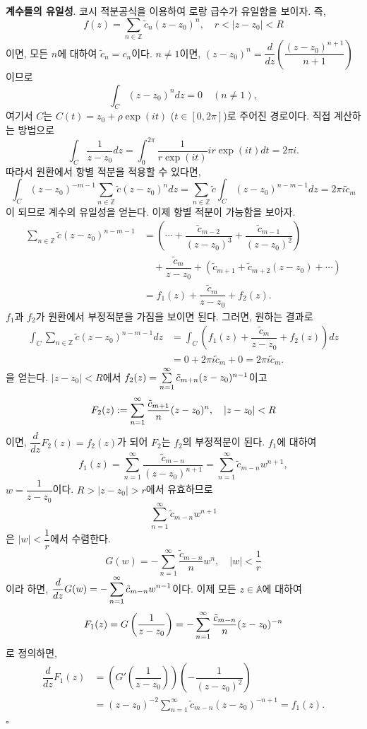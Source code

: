{\bf 계수들의 유일성}.
코시 적분공식을 이용하여 로랑 급수가 유일함을 보이자. 즉,
\[
f(z) = \sum_{n\in\mathbb Z} \tilde c_n(z-z_0)^n, \quad
r < |z-z_0| <R
\]
이면, 모든 $n$에 대하여 $\tilde c_n = c_n$이다.
$n\ne 1$이면, $(z-z_0)^n = \dfrac d{dz} \left( \dfrac{(z-z_0)^{n+1}}{n+1} \right)$이므로
\[
\int_C (z-z_0)^n dz = 0 \quad (n\ne1),
\]
여기서 $C$는 $C(t)=z_0 + \rho\exp(it)$ ($t\in[0,2\pi]$)로 주어진 경로이다.
직접 계산하는 방법으로
\[
\int_C \dfrac1{z-z_0} dz = \int_0^{2\pi} \dfrac1{r\exp(it)}ir\exp(it)dt = 2\pi i.
\]
따라서 원환에서 항별 적분을 적용할 수 있다면,
\[
\int_C (z-z_0)^{-m-1} \sum_{n\in\mathbb Z} \tilde c (z-z_0)^n dz
= \sum_{n\in\mathbb Z} \tilde c \int_C (z-z_0)^{n-m-1} dz = 2\pi i \tilde c_m
\]
이 되므로 계수의 유일성을 얻는다.
이제 항별 적분이 가능함을 보아자.
\begin{align*}
 \sum_{n\in\mathbb Z} \tilde c (z-z_0)^{n-m-1}
 &= \left( \cdots + \dfrac{\tilde c_{m-2}}{(z-z_0)^3} +  \dfrac{\tilde c_{m-1}}{(z-z_0)^2} \right) \\
 & \quad + \dfrac{\tilde c_m}{z-z_0} + (\tilde c_{m+1} + \tilde c_{m+2}(z-z_0) + \cdots) \\
 & = f_1(z) + \dfrac{\tilde c_m}{z-z_0} + f_2(z).
\end{align*}
$f_1$과 $f_2$가 원환에서 부정적분을 가짐을 보이면 된다. 그러면, 원하는 결과로
\begin{align*}
\int_C  \sum_{n\in\mathbb Z} \tilde c (z-z_0)^{n-m-1} dz
&= \int_C \left( f_1(z) + \dfrac{\tilde c_m}{z-z_0} + f_2(z) \right) dz \\
&= 0 + 2\pi i \tilde c_m + 0 = 2\pi i \tilde c_m.
\end{align*}
을 얻는다.
$|z-z_0|<R$에서 $f_2(z) = \sum\limits_{n=1}^\infty \tilde c_{m+n} (z-z_0)^{n-1}$이고
\[
F_2(z) := \sum\limits_{n=1}^\infty \displaystyle\frac{\tilde c_{m+1}}n (z-z_0)^n,
\quad |z-z_0|<R
\]
이면, $\dfrac d{dz} F_2(z) = f_2(z)$가 되어 $F_2$는 $f_2$의 부정적분이 된다.
$f_1$에 대하여 
\[
f_1(z) = \sum_{n=1}^\infty \dfrac{\tilde c_{m-n}}{(z-z_0)^{n+1}} 
= \sum_{n=1}^\infty \tilde c_{m-n} w^{n+1},
\]
$w = \dfrac1{z-z_0}$이다. $R>|z-z_0| >r$에서 유효하므로
\[
\sum_{n=1}^\infty \tilde c_{m-n} w^{n+1}
\]
은 $|w|<\dfrac1r$에서 수렴한다. 
\[
G(w) = - \sum_{n=1}^\infty \dfrac{\tilde c_{m-n}}n w^n,\quad
|w|<\dfrac1r
\]
이라 하면, $\displaystyle\frac d{dz} G(w) = - \sum\limits_{n=1}^\infty \tilde c_{m-n} w^{n-1}$이다. 
이제 모든 $z\in \mathbb A$에 대하여
\[
F_1(z) = G\left(\displaystyle\frac1{z-z_0}\right) 
= - \sum\limits_{n=1}^\infty\displaystyle\frac{\tilde c_{m-n}}n (z-z_0)^{-n}
\]
로 정의하면,
\begin{align*}
\dfrac d{dz} F_1(z)
&= \left( G'\left(\dfrac1{z-z_0}\right)\right) \left(- \dfrac1{(z-z_0)^2}\right) \\
&= (z-z_0)^{-2} \sum_{n=1}^\infty \tilde c_{m-n} (z-z_0)^{-n+1} = f_1(z).
\end{align*}
\hfill $\square$


